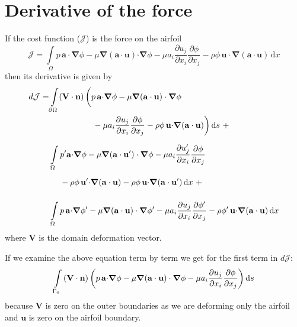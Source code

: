 \documentclass[12pt, a4paper]{article}
\begin{document}
\section{Derivative of the force} \label{app:force}
If the cost function ($\mathcal{J}$) is the force on the airfoil
\begin{equation}
\mathcal{J} = \int\limits_{\Omega}{{p\, \mathbf{a \cdot} \boldsymbol{\nabla} \phi} -
    {\mu \boldsymbol{\nabla}(\mathbf{a \cdot u}) \mathbf{\cdot} \boldsymbol{\nabla} \phi} - 
    {\mu a_i \frac{\partial u_j}{\partial x_i} \frac{\partial \phi}{\partial x_j}} - 
    {\rho \phi \, \mathbf{u \cdot} \boldsymbol{\nabla}(\mathbf{a \cdot u})}
    \,  \mathrm{d}x}
\end{equation}
then its derivative is given by
\begin{equation} \label{cost_change_1}
\begin{split}
d \mathcal{J} =& \int\limits_{\partial \Omega}(\mathbf{V \cdot n}) \, \bigg{(} 
{p\, \mathbf{a \cdot} \boldsymbol{\nabla} \phi} -
{\mu \boldsymbol{\nabla}(\mathbf{a \cdot u}) \cdot \boldsymbol{\nabla} \phi} \\
& \phantom{\int\limits_{\partial \Omega}(\mathbf{V \cdot n}) \, \bigg{(} \ } 
- {\mu a_i \frac{\partial u_j}{\partial x_i} \frac{\partial \phi}{\partial x_j}} - 
{\rho \phi \, \mathbf{u \cdot} \boldsymbol{\nabla}(\mathbf{a \cdot u})} 
\bigg{)} \, \mathrm{d}s \ + \\
&\int\limits_{\Omega} {p' \mathbf{a \cdot} \boldsymbol{\nabla} \phi} - 
{\mu \boldsymbol{\nabla}(\mathbf{a \cdot u'}) \cdot \boldsymbol{\nabla} \phi} -
{\mu a_i \frac{\partial u'_j}{\partial x_i} \frac{\partial \phi}{\partial x_j}} \\ 
& \phantom{\int\limits_{\Omega} \ }
- {\rho \phi \, \mathbf{u' \cdot} \boldsymbol{\nabla}(\mathbf{a \cdot u})} - 
{\rho \phi \, \mathbf{u \cdot} \boldsymbol{\nabla}(\mathbf{a \cdot u'})}
\,  \mathrm{d}x \ + \\
&\int\limits_{\Omega} p\, \mathbf{a \cdot} \boldsymbol{\nabla} \phi' -
{\mu \boldsymbol{\nabla}(\mathbf{a \cdot u}) \cdot \boldsymbol{\nabla} \phi'} - 
{\mu a_i \frac{\partial u_j}{\partial x_i} \frac{\partial \phi'}{\partial x_j}} - 
{\rho \phi' \, \mathbf{u \cdot} \boldsymbol{\nabla}(\mathbf{a \cdot u})}
\, \mathrm{d}x
\end{split}
\end{equation}
where $\mathbf{V}$ is the domain deformation vector.

If we examine the above equation term by term we get for the first term in $d \mathcal{J}$:
\begin{equation} \label{cost_change_term_1}
\int\limits_{\Gamma_0}{(\mathbf{V \cdot n}) \, \bigg{(} 
    {p\, \mathbf{a \cdot} \boldsymbol{\nabla} \phi} -
    {\mu \boldsymbol{\nabla}(\mathbf{a \cdot u}) \cdot \boldsymbol{\nabla} \phi} - 
    {\mu a_i \frac{\partial u_j}{\partial x_i} \frac{\partial \phi}{\partial x_j}} 
    \bigg{)}} \, \mathrm{d}s
\end{equation}
because $\mathbf{V}$ is zero on the outer boundaries as we are deforming only the airfoil and $\mathbf{u}$ is zero on the airfoil boundary.
\end{document}
